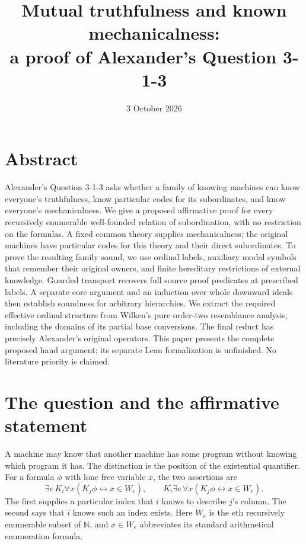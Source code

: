 \documentclass[11pt]{article}
\title{Mutual truthfulness and known mechanicalness:\\
  a proof of Alexander's Question 3-1-3}
\author{}
\date{3 October 2026}
\newcommand{\N}{\mathbb N}
\begin{document}
\maketitle

\section*{Abstract}

Alexander's Question 3-1-3 asks whether a family of knowing machines can
know everyone's truthfulness, know particular codes for its subordinates,
and know everyone's mechanicalness. We give a proposed affirmative proof
for every recursively enumerable well-founded relation of subordination,
with no restriction on the formulas. A fixed common theory supplies
mechanicalness; the original machines have particular codes for this
theory and their direct subordinates. To prove the resulting family
sound, we use ordinal labels, auxiliary modal symbols that remember
their original owners, and finite hereditary restrictions of external
knowledge. Guarded transport recovers full source proof predicates at
prescribed labels. A separate core argument and an induction over whole
downward ideals then establish soundness for arbitrary hierarchies. We
extract the required effective ordinal structure from Wilken's pure
order-two resemblance analysis, including the domains of its partial
base conversions. The final reduct has precisely Alexander's original
operators. This paper presents the complete proposed hand argument;
its separate Lean formalization is unfinished. No literature priority
is claimed.

\section{The question and the affirmative statement}\label{sec:statement}

A machine may know that another machine has some program without
knowing which program it has. The distinction is the position of the
existential quantifier. For a formula $\phi$ with lone free variable $x$,
the two assertions are
\[
  \exists e\,K_i\forall x(K_j\phi\leftrightarrow x\in W_e),
  \qquad
  K_i\exists e\,\forall x(K_j\phi\leftrightarrow x\in W_e).
\]
The first supplies a particular index that $i$ knows to describe $j$'s
column. The second says that $i$ knows such an index exists. Here $W_e$
is the $e$th recursively enumerable subset of $\N$, and $x\in W_e$
abbreviates its standard arithmetical enumeration formula.
\end{document}
